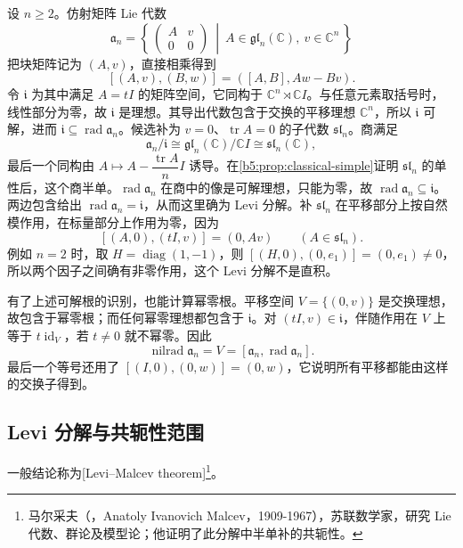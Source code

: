 \begin{example}\label{b5:exm:affine-levi}
	设 \(n\ge2\)。仿射矩阵 Lie 代数
	\[
		\mathfrak a_n= \left\{\,
		\begin{pmatrix}A&v\\0&0\end{pmatrix}
		\ \middle|\ A\in\mathfrak{gl}_n(\mathbb C),\
		v\in\mathbb C^n \,\right\}
	\]
	把块矩阵记为 \((A,v)\)，直接相乘得到
	\[
		[(A,v),(B,w)]=([A,B],Aw-Bv).
	\]
	令 \(\mathfrak i\) 为其中满足 \(A=tI\) 的矩阵空间，它同构于 \(\mathbb C^n\rtimes\mathbb C I\)。与任意元素取括号时，线性部分为零，故 \(\mathfrak i\) 是理想。其导出代数包含于交换的平移理想 \(\mathbb C^n\)，所以 \(\mathfrak i\) 可解，进而 \(\mathfrak i\subseteq\operatorname{rad}\mathfrak a_n\)。候选补为 \(v=0\)、\(\operatorname{tr}A=0\) 的子代数 \(\mathfrak{sl}_n\)。商满足
	\[
		\mathfrak a_n/\mathfrak i \cong\mathfrak{gl}_n(\mathbb C)/\mathbb C I \cong\mathfrak{sl}_n(\mathbb C),
	\]
	最后一个同构由 \(A\mapsto A-\dfrac{\operatorname{tr}A}{n}I\) 诱导。在\cref{b5:prop:classical-simple}证明 \(\mathfrak{sl}_n\) 的单性后，这个商半单。\(\operatorname{rad}\mathfrak a_n\) 在商中的像是可解理想，只能为零，故 \(\operatorname{rad}\mathfrak a_n\subseteq\mathfrak i\)。两边包含给出 \(\operatorname{rad}\mathfrak a_n=\mathfrak i\)，从而这里确为 Levi 分解。补 \(\mathfrak{sl}_n\) 在平移部分上按自然模作用，在标量部分上作用为零，因为
	\[
		[(A,0),(tI,v)]=(0,Av)\qquad(A\in\mathfrak{sl}_n).
	\]
	例如 \(n=2\) 时，取 \(H=\operatorname{diag}(1,-1)\)，则 \([(H,0),(0,e_1)]=(0,e_1)\ne0\)，所以两个因子之间确有非零作用，这个 Levi 分解不是直积。

	有了上述可解根的识别，也能计算幂零根。平移空间 \(V=\{(0,v)\}\) 是交换理想，故包含于幂零根；而任何幂零理想都包含于 \(\mathfrak i\)。对 \((tI,v)\in\mathfrak i\)，伴随作用在 \(V\) 上等于 \(t\operatorname{id}_V\)，若 \(t\ne0\) 就不幂零。因此
	\[
		\operatorname{nilrad}\mathfrak a_n=V =[\mathfrak a_n,\operatorname{rad}\mathfrak a_n].
	\]
	最后一个等号还用了 \([(I,0),(0,w)]=(0,w)\)，它说明所有平移都能由这样的交换子得到。
\end{example}

\subsection{Levi 分解与共轭性范围}
\label{b5:subsec:1204:02}

一般结论称为[Levi--Malcev theorem]\footnote{马尔采夫（，Anatoly Ivanovich Malcev，1909-1967），苏联数学家，研究 Lie 代数、群论及模型论；他证明了此分解中半单补的共轭性。}。

